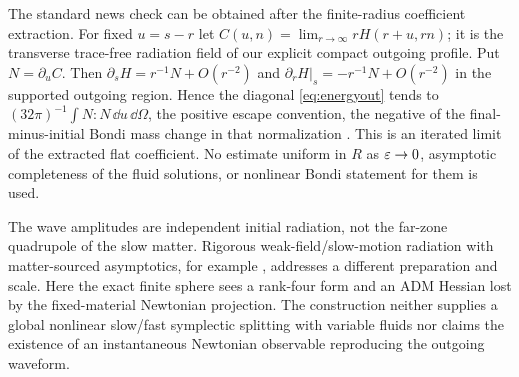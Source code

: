 The standard news check can be obtained after the finite-radius coefficient extraction. For fixed \(u=s-r\) let \(C(u,n)=\lim_{r\to\infty}rH(r+u,rn)\); it is the transverse trace-free radiation field of our explicit compact outgoing profile. Put \(N=\partial_u C\). Then \(\partial_sH=r^{-1}N+O(r^{-2})\) and \(\partial_rH|_s=-r^{-1}N+O(r^{-2})\) in the supported outgoing region. Hence the diagonal \eqref{eq:energyout} tends to \((32\pi)^{-1}\int N:N\,\dd u\,\dd\Omega\), the positive escape convention, the negative of the final-minus-initial Bondi mass change in that normalization \cite{Bondi}. This is an iterated limit of the extracted flat coefficient. No estimate uniform in \(R\) as \(\varepsilon\to0\), asymptotic completeness of the fluid solutions, or nonlinear Bondi statement for them is used.

The wave amplitudes are independent initial radiation, not the far-zone quadrupole of the slow matter. Rigorous weak-field/slow-motion radiation with matter-sourced asymptotics, for example \cite{FutamaseSchutz}, addresses a different preparation and scale. Here the exact finite sphere sees a rank-four form and an ADM Hessian lost by the fixed-material Newtonian projection. The construction neither supplies a global nonlinear slow/fast symplectic splitting with variable fluids nor claims the existence of an instantaneous Newtonian observable reproducing the outgoing waveform.

